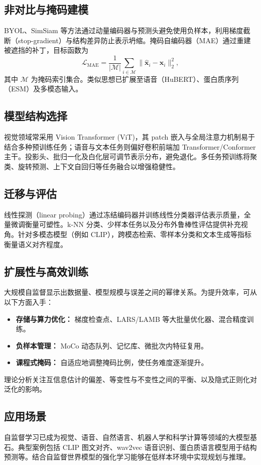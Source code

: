 \documentclass[UTF8,zihao=-4]{ctexart}
\begin{document}
\subsection{非对比与掩码建模}
BYOL、SimSiam 等方法通过动量编码器与预测头避免使用负样本，利用梯度截断（stop-gradient）与结构差异防止表示坍缩。掩码自编码器（MAE）通过重建被遮挡的补丁，目标函数为
\begin{equation}
  \mathcal{L}_{\mathrm{MAE}} = \frac{1}{|\mathcal{M}|} \sum_{i \in \mathcal{M}} \| \hat{\mathbf{x}}_i - \mathbf{x}_i \|_2^2,
\end{equation}
其中 $\mathcal{M}$ 为掩码索引集合。类似思想已扩展至语音（HuBERT）、蛋白质序列（ESM）及多模态输入。

\subsection{模型结构选择}
视觉领域常采用 Vision Transformer (ViT)，其 patch 嵌入与全局注意力机制易于结合多种预训练任务；语音与文本任务则偏好卷积前端加 Transformer/Conformer 主干。投影头、批归一化及白化层可调节表示分布，避免退化。多任务预训练将聚类、旋转预测、上下文自回归等任务融合以增强稳健性。

\subsection{迁移与评估}
线性探测（linear probing）通过冻结编码器并训练线性分类器评估表示质量，全量微调衡量可塑性。k-NN 分类、少样本任务以及分布外鲁棒性评估提供补充视角。针对多模态模型（例如 CLIP），跨模态检索、零样本分类和文本生成等指标衡量语义对齐程度。

\subsection{扩展性与高效训练}
大规模自监督显示出数据量、模型规模与误差之间的幂律关系。为提升效率，可从以下方面入手：
\begin{itemize}
  \item \textbf{存储与算力优化：} 梯度检查点、LARS/LAMB 等大批量优化器、混合精度训练。
  \item \textbf{负样本管理：} MoCo 动态队列、记忆库、微批次内特征复用。
  \item \textbf{课程式掩码：} 自适应地调整掩码比例，使任务难度逐渐提升。
\end{itemize}
理论分析关注互信息估计的偏差、等变性与不变性之间的平衡、以及隐式正则化对泛化的影响。

\subsection{应用场景}
自监督学习已成为视觉、语音、自然语言、机器人学和科学计算等领域的大模型基石。典型案例包括 CLIP 图文对齐、wav2vec 语音识别、蛋白质语言模型用于结构预测等。结合自监督世界模型的强化学习能够在低样本环境中实现规划与推理。
\end{document}
